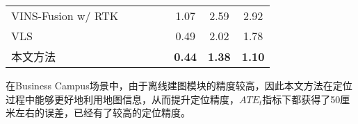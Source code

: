 \begin{table}
{\begin{tabular}{lccccccc}
VINS-Fusion w/ RTK &                                                                                &                     &                     &                     & 1.07          & 2.59          & 2.92          \\
VLS                &                                                                                &                     &                     &                     & 0.49          & 2.02          & 1.78          \\
本文方法               &                                                                                &                     &                     &                     & \cellcolor[HTML]{FFCCC9}\textbf{0.44} & \cellcolor[HTML]{FFCCC9}\textbf{1.38} & \cellcolor[HTML]{FFCCC9}\textbf{1.10}          \\ \bottomrule
\end{tabular}}
\label{tab:loc_4seaons_bc56}
\end{table}

在Business Campus场景中，由于离线建图模块的精度较高，因此本文方法在定位过程中能够更好地利用地图信息，从而提升定位精度，$ATE_t$指标下都获得了50厘米左右的误差，已经有了较高的定位精度。

